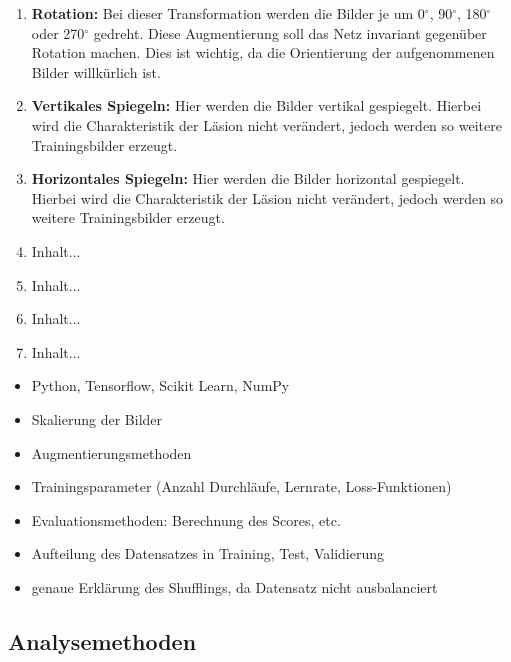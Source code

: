 \begin{enumerate}
    \item \textbf{Rotation:} Bei dieser Transformation werden die Bilder je um 0$^{\circ}$, 90$^{\circ}$, 180$^{\circ}$ oder 270$^{\circ}$ gedreht. Diese Augmentierung soll das Netz invariant gegenüber Rotation machen. Dies ist wichtig, da die Orientierung der aufgenommenen Bilder willkürlich ist.
    \item \textbf{Vertikales Spiegeln:} Hier werden die Bilder vertikal gespiegelt. Hierbei wird die Charakteristik der Läsion nicht verändert, jedoch werden so weitere Trainingsbilder erzeugt. 
    \item \textbf{Horizontales Spiegeln:} Hier werden die Bilder horizontal gespiegelt. Hierbei wird die Charakteristik der Läsion nicht verändert, jedoch werden so weitere Trainingsbilder erzeugt.
    \item Inhalt...
    \item Inhalt...
    \item Inhalt...
    \item Inhalt...
\end{enumerate}



\begin{itemize}
	\item Python, Tensorflow, Scikit Learn, NumPy
	\item Skalierung der Bilder
	\item Augmentierungsmethoden
	\item Trainingsparameter (Anzahl Durchläufe, Lernrate, Loss-Funktionen)
	\item Evaluationsmethoden: Berechnung des Scores, etc.
	\item Aufteilung des Datensatzes in Training, Test, Validierung
	\item genaue Erklärung des Shufflings, da Datensatz nicht ausbalanciert
\end{itemize}

\subsection{Analysemethoden}

